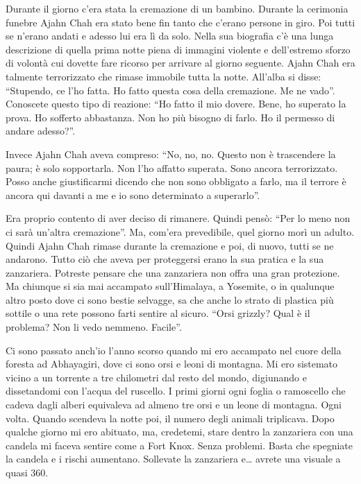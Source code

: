 Durante il giorno c'era stata la cremazione di un bambino. Durante la cerimonia funebre Ajahn Chah era stato bene fin tanto che c'erano persone in giro. Poi tutti se n'erano andati e adesso lui era lì da solo. Nella sua biografia c'è una lunga descrizione di quella prima notte piena di immagini violente e dell'estremo sforzo di volontà cui dovette fare ricorso per arrivare al giorno seguente. Ajahn Chah era talmente terrorizzato che rimase immobile tutta la notte. All'alba si disse: ``Stupendo, ce l'ho fatta. Ho fatto questa cosa della cremazione. Me ne vado''. Conoscete questo tipo di reazione: ``Ho fatto il mio dovere. Bene, ho superato la prova. Ho sofferto abbastanza. Non ho più bisogno di farlo. Ho il permesso di andare adesso?''.

Invece Ajahn Chah aveva compreso: ``No, no, no. Questo non è trascendere la paura; è solo sopportarla. Non l'ho affatto superata. Sono ancora terrorizzato. Posso anche giustificarmi dicendo che non sono obbligato a farlo, ma il terrore è ancora qui davanti a me e io sono determinato a superarlo''.

Era proprio contento di aver deciso di rimanere. Quindi pensò: ``Per lo meno non ci sarà un'altra cremazione''. Ma, com'era prevedibile, quel giorno morì un adulto. Quindi Ajahn Chah rimase durante la cremazione e poi, di nuovo, tutti se ne andarono. Tutto ciò che aveva per proteggersi erano la sua pratica e la sua zanzariera. Potreste pensare che una zanzariera non offra una gran protezione. Ma chiunque si sia mai accampato sull'Himalaya, a Yosemite, o in qualunque altro posto dove ci sono bestie selvagge, sa che anche lo strato di plastica più sottile o una rete possono farti sentire al sicuro. ``Orsi grizzly? Qual è il problema? Non li vedo nemmeno. Facile''.

Ci sono passato anch'io l'anno scorso quando mi ero accampato nel cuore della foresta ad Abhayagiri, dove ci sono orsi e leoni di montagna. Mi ero sistemato vicino a un torrente a tre chilometri dal resto del mondo, digiunando e dissetandomi con l'acqua del ruscello. I primi giorni ogni foglia o ramoscello che cadeva dagli alberi equivaleva ad almeno tre orsi e un leone di montagna. Ogni volta. Quando scendeva la notte poi, il numero degli animali triplicava. Dopo qualche giorno mi ero abituato, ma, credetemi, stare dentro la zanzariera con una candela mi faceva sentire come a Fort Knox. Senza problemi. Basta che spegniate la candela e i rischi aumentano. Sollevate la zanzariera e\ldots{} avrete una visuale a quasi 360\textdegree.

